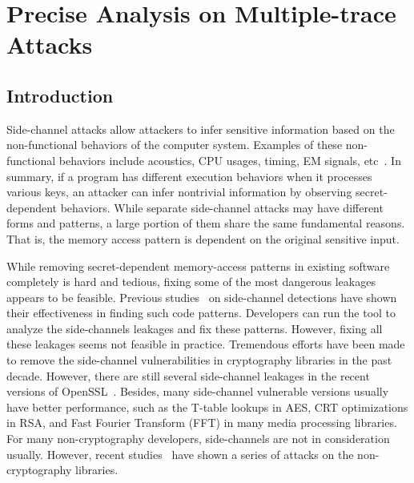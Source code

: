
\chapter{Precise Analysis on Multiple-trace Attacks}\label{chapter5}
\section{Introduction}
Side-channel attacks allow attackers to infer sensitive information based on the non-functional behaviors of the computer system. Examples of these non-functional behaviors include acoustics, CPU usages, timing, EM signals, etc~\cite{agrawal2002side,hund2013practical,halevi2015keyboard,batina2019csi}. In summary, if a program has different execution behaviors when it processes various keys, an attacker can infer nontrivial information by observing secret-dependent behaviors. While separate side-channel attacks may have different forms and patterns, a large portion of them share the same fundamental reasons. That is, the memory access pattern is dependent on the original sensitive input.

While removing secret-dependent memory-access patterns in existing software completely is hard and tedious, fixing some of the most dangerous leakages appears to be feasible. Previous studies~\cite{182946,203878,182946,236338,217537,langley2010ctgrind,xiao2017stacco,wang2019time,Wichelmann:2018:MFF:3274694.3274741,bao2021abacus} on side-channel detections have shown their effectiveness in finding such code patterns. Developers can run the tool to analyze the side-channels leakages and fix these patterns. However, fixing all
these leakages seems not feasible in practice.  Tremendous efforts have been made to remove the side-channel vulnerabilities in cryptography
libraries in the past decade. However,  there are
still several side-channel leakages in the recent versions of OpenSSL~\cite{OpenSSL-1.1.1-note}. Besides, many side-channel vulnerable versions usually
have better performance, such as the T-table lookups in AES, CRT
optimizations in RSA, and Fast Fourier Transform (FFT) in many media processing libraries. For many non-cryptography developers, side-channels are not in consideration usually. However, recent studies~\cite{xu2015controlled,191010,hahnel2017high} have shown a series of attacks on the non-cryptography libraries.


